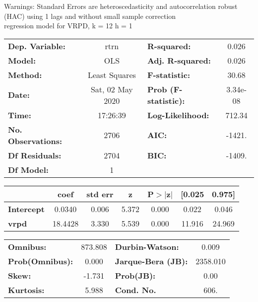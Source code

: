 Warnings: \newline
 [1] Standard Errors are heteroscedasticity and autocorrelation robust (HAC) using 1 lags and without small sample correction\\ 

regression model for VRPD, k = 12 h = 1\begin{center}
\begin{tabular}{lclc}
\toprule
\textbf{Dep. Variable:}    &       rtrn       & \textbf{  R-squared:         } &     0.026   \\
\textbf{Model:}            &       OLS        & \textbf{  Adj. R-squared:    } &     0.026   \\
\textbf{Method:}           &  Least Squares   & \textbf{  F-statistic:       } &     30.68   \\
\textbf{Date:}             & Sat, 02 May 2020 & \textbf{  Prob (F-statistic):} &  3.34e-08   \\
\textbf{Time:}             &     17:26:39     & \textbf{  Log-Likelihood:    } &    712.34   \\
\textbf{No. Observations:} &        2706      & \textbf{  AIC:               } &    -1421.   \\
\textbf{Df Residuals:}     &        2704      & \textbf{  BIC:               } &    -1409.   \\
\textbf{Df Model:}         &           1      & \textbf{                     } &             \\
\bottomrule
\end{tabular}
\begin{tabular}{lcccccc}
                   & \textbf{coef} & \textbf{std err} & \textbf{z} & \textbf{P$> |$z$|$} & \textbf{[0.025} & \textbf{0.975]}  \\
\midrule
\textbf{Intercept} &       0.0340  &        0.006     &     5.372  &         0.000        &        0.022    &        0.046     \\
\textbf{vrpd}      &      18.4428  &        3.330     &     5.539  &         0.000        &       11.916    &       24.969     \\
\bottomrule
\end{tabular}
\begin{tabular}{lclc}
\textbf{Omnibus:}       & 873.808 & \textbf{  Durbin-Watson:     } &    0.009  \\
\textbf{Prob(Omnibus):} &   0.000 & \textbf{  Jarque-Bera (JB):  } & 2358.010  \\
\textbf{Skew:}          &  -1.731 & \textbf{  Prob(JB):          } &     0.00  \\
\textbf{Kurtosis:}      &   5.988 & \textbf{  Cond. No.          } &     606.  \\
\bottomrule
\end{tabular}
\end{center}


